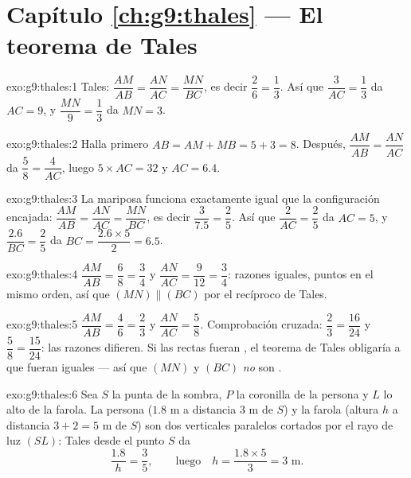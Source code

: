 \section*{Capítulo \ref{ch:g9:thales} --- El teorema de Tales}

\begin{solution}{exo:g9:thales:1}
Tales: $\dfrac{AM}{AB} = \dfrac{AN}{AC} = \dfrac{MN}{BC}$, es decir
$\dfrac26 = \dfrac13$. Así que $\dfrac{3}{AC} = \dfrac13$ da $AC = 9$,
y $\dfrac{MN}{9} = \dfrac13$ da $MN = 3$.
\end{solution}

\begin{solution}{exo:g9:thales:2}
Halla primero $AB = AM + MB = 5 + 3 = 8$. Después,
$\dfrac{AM}{AB} = \dfrac{AN}{AC}$ da $\dfrac58 = \dfrac{4}{AC}$, luego
$5 \times AC = 32$ y $AC = 6.4$.
\end{solution}

\begin{solution}{exo:g9:thales:3}
La mariposa funciona exactamente igual que la configuración encajada:
$\dfrac{AM}{AB} = \dfrac{AN}{AC} = \dfrac{MN}{BC}$, es decir
$\dfrac{3}{7.5} = \dfrac25$. Así que $\dfrac{2}{AC} = \dfrac25$ da
$AC = 5$, y $\dfrac{2.6}{BC} = \dfrac25$ da
$BC = \dfrac{2.6 \times 5}{2} = 6.5$.
\end{solution}

\begin{solution}{exo:g9:thales:4}
$\dfrac{AM}{AB} = \dfrac68 = \dfrac34$ y
$\dfrac{AN}{AC} = \dfrac{9}{12} = \dfrac34$: razones iguales, puntos en el
mismo orden, así que $(MN) \parallel (BC)$ por el recíproco de Tales.
\end{solution}

\begin{solution}{exo:g9:thales:5}
$\dfrac{AM}{AB} = \dfrac46 = \dfrac23$ y
$\dfrac{AN}{AC} = \dfrac58$. Comprobación cruzada: $\dfrac23 = \dfrac{16}{24}$
y $\dfrac58 = \dfrac{15}{24}$: las razones difieren. Si las rectas fueran
, el teorema de Tales obligaría a que fueran iguales --- así que $(MN)$
y $(BC)$ \emph{no} son .
\end{solution}

\begin{solution}{exo:g9:thales:6}
Sea $S$ la punta de la sombra, $P$ la coronilla de la persona y $L$
lo alto de la farola. La persona ($1.8$ m a distancia $3$ m de $S$) y
la farola (altura $h$ a distancia $3 + 2 = 5$ m de $S$) son dos
 verticales paralelos cortados por el rayo de luz $(SL)$: Tales desde el
punto $S$ da
\[
\frac{1.8}{h} = \frac{3}{5},
\qquad\text{luego}\quad
h = \frac{1.8 \times 5}{3} = 3 \text{ m}.
\]
\end{solution}


